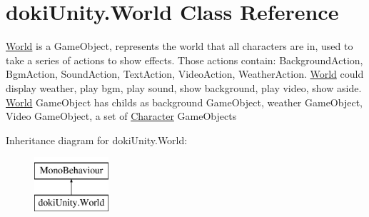 \hypertarget{classdoki_unity_1_1_world}{}\section{doki\+Unity.\+World Class Reference}
\label{classdoki_unity_1_1_world}


\hyperlink{classdoki_unity_1_1_world}{World} is a Game\+Object, represents the world that all characters are in, used to take a series of actions to show effects. Those actions contain\+: Background\+Action, Bgm\+Action, Sound\+Action, Text\+Action, Video\+Action, Weather\+Action. \hyperlink{classdoki_unity_1_1_world}{World} could display weather, play bgm, play sound, show background, play video, show aside. \hyperlink{classdoki_unity_1_1_world}{World} Game\+Object has childs as background Game\+Object, weather Game\+Object, Video Game\+Object, a set of \hyperlink{classdoki_unity_1_1_character}{Character} Game\+Objects  


Inheritance diagram for doki\+Unity.\+World\+:\begin{figure}[H]
\begin{center}
\leavevmode
\includegraphics[height=2.000000cm]{classdoki_unity_1_1_world}
\end{center}
\end{figure}
